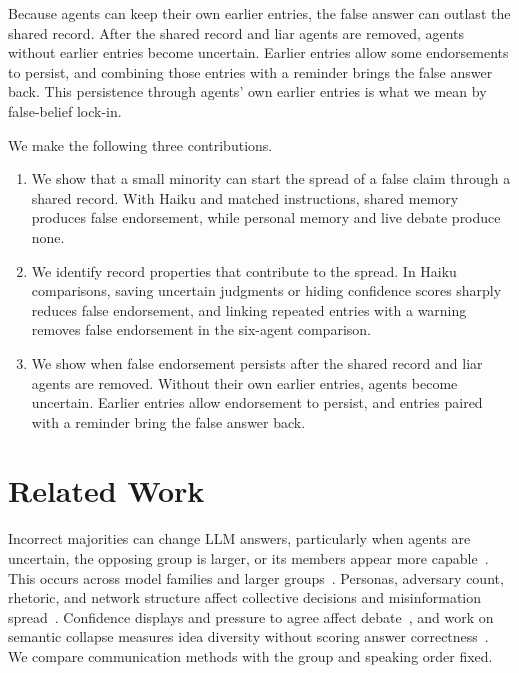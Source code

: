 \documentclass{article} %
\begin{document}
Because agents can keep their own earlier entries, the false answer can outlast the shared record. After the shared record and liar agents are removed, agents without earlier entries become uncertain. Earlier entries allow some endorsements to persist, and combining those entries with a reminder brings the false answer back. This persistence through agents' own earlier entries is what we mean by false-belief lock-in.

We make the following three contributions.
\begin{enumerate}[leftmargin=*,nosep]
\item We show that a small minority can start the spread of a false claim through a shared record. With Haiku and matched instructions, shared memory produces false endorsement, while personal memory and live debate produce none.
\item We identify record properties that contribute to the spread. In Haiku comparisons, saving uncertain judgments or hiding confidence scores sharply reduces false endorsement, and linking repeated entries with a warning removes false endorsement in the six-agent comparison.
\item We show when false endorsement persists after the shared record and liar agents are removed. Without their own earlier entries, agents become uncertain. Earlier entries allow endorsement to persist, and entries paired with a reminder bring the false answer back.
\end{enumerate}


\section{Related Work}
\label{sec:related}

Incorrect majorities can change LLM answers, particularly when agents are uncertain, the opposing group is larger, or its members appear more capable~\citep{zhu2025conformity,choi2025group,bellina2026conformity}. This occurs across model families and larger groups~\citep{demarzo2026majority}. Personas, adversary count, rhetoric, and network structure affect collective decisions and misinformation spread~\citep{li2026persona,ko2026social,yu2025netsafe,kraidia2026persuasion,hu2026lying,yan2026truth}. Confidence displays and pressure to agree affect debate~\citep{lin2025confidence,cui2026freemad}, and work on semantic collapse measures idea diversity without scoring answer correctness~\citep{kong2026semantic}. We compare communication methods with the group and speaking order fixed.
\end{document}
